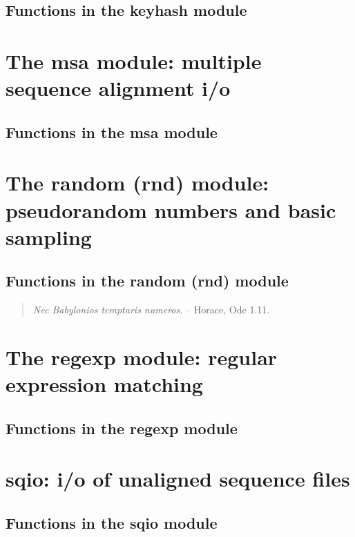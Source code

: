 \documentclass[11pt]{book}
\begin{document}
\subsection{Functions in the keyhash module}


\newpage
\section{The msa module: multiple sequence alignment i/o}

\subsection{Functions in the msa module}


\newpage
\section{The random (rnd) module: pseudorandom numbers and basic sampling}

\subsection{Functions in the random (rnd) module}

\vspace*{\fill}

\begin{quote}
\emph{Nec Babylonios temptaris numeros.} \hspace{3em} -- Horace, Ode
1.11. \\ 
\end{quote}     

\newpage
\section{The regexp module: regular expression matching}

\subsection{Functions in the regexp module}


\newpage
\section{sqio: i/o of unaligned sequence files}

\subsection{Functions in the sqio module}

\end{document}
